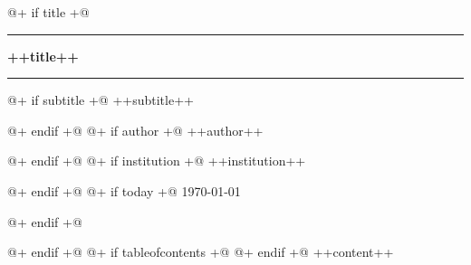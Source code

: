 \documentclass[++fontsize++]{++documentclass++}
\begin{document}
@+ if title +@
\begin{titlepage}
  \begin{center}
    \rule{\linewidth}{2pt}\par
    \bigskip
        {\huge \textbf{++title++}}
    \smallskip
    \rule{\linewidth}{1pt}\par
    @+ if subtitle +@
    \medskip
    {\LARGE ++subtitle++}\par
    @+ endif +@
    @+ if author +@
    \vfill
    ++author++\par
    @+ endif +@
    \vfill
    @+ if institution +@
    ++institution++\par
    \medskip
    @+ endif +@
    @+ if today +@
    \today\par
    \smallskip
    @+ endif +@
    \end{center}
\end{titlepage}
@+ endif +@
@+ if tableofcontents +@
\tableofcontents\newpage
@+ endif +@
++content++
\end{document}
